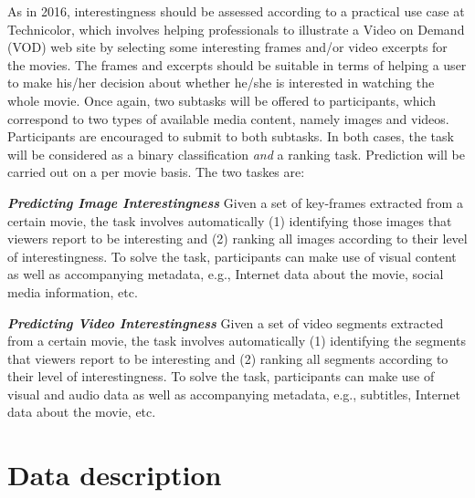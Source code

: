 \documentclass[sigconf]{acmart-me}
\begin{document}
As in 2016, interestingness should be assessed according to a practical use case at Technicolor, which involves helping professionals to illustrate a Video on Demand (VOD) web site by selecting some interesting frames and/or video excerpts for the movies. The frames and excerpts should be suitable in terms of helping a user to make his/her decision about whether he/she is interested in watching the whole movie.
Once again, two subtasks will be offered to participants, which correspond to two types of available media content, namely images and videos. Participants are encouraged to submit to both subtasks. In both cases, the task will be considered as a binary classification \emph{and} a ranking task. Prediction will be carried out on a per movie basis.
The two taskes are:

\emph{\bf Predicting Image Interestingness} Given a set of key-frames extracted from a certain movie, the task involves automatically (1) identifying those images that viewers report to be interesting and (2) ranking all images according to their level of interestingness. To solve the task, participants can make use of visual content as well as accompanying metadata, e.g., Internet data about the movie, social media information, etc.

\emph{\bf Predicting Video Interestingness} Given a set of video segments extracted from a certain movie, the task involves automatically (1) identifying the segments that viewers report to be interesting and (2) ranking all segments according to their level of interestingness. To solve the task, participants can make use of visual and audio data as well as accompanying metadata, e.g., subtitles, Internet data about the movie, etc.

\vspace{-0.2cm}
\section{Data description}
\end{document}
